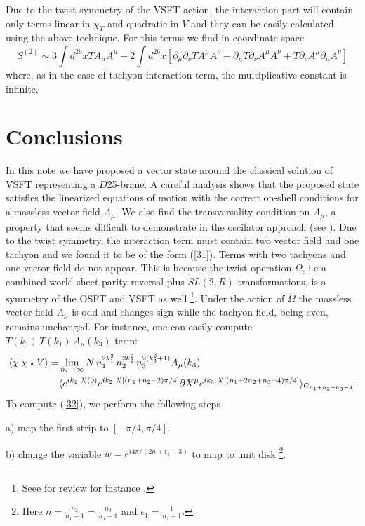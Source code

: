 \documentclass[a4paper,12pt]{article}
\begin{document}
Due to the twist symmetry of the VSFT action, the interaction part will contain
only terms linear in $\chi_T$ and quadratic in $V$ and they can be 
easily calculated using the above technique.
For this terms we find in coordinate space
\begin{equation}
S^{(2)}\sim 3\int d^{26}x T A_\mu A^\mu +
2\int d^{26}x \left[\partial_\mu\partial_\nu T A^\mu A^\nu 
-\partial_\mu T\partial_\nu A^\mu A^\nu +
T\partial_\nu  A^\mu \partial_\mu A^\nu\right]
\label{31}
\end{equation}
where, as in the case of tachyon interaction term, the multiplicative
constant is infinite.

\section{Conclusions}

In this note we have proposed a vector state around the classical solution of
VSFT representing a $D$25-brane. A careful analysis shows that the 
proposed state
satisfies the linearized equations of motion with the correct on-shell
conditions for a massless vector field $A_\mu$. We also find the transversality
condition on $A_\mu$, a property that seems difficult to 
demonstrate in the oscilator approach (see \cite{hk,hm}). 
Due to the twist symmetry, the interaction term must contain two vector field 
and one tachyon and we found it to be of the form (\ref{31}). 
Terms with two tachyons and one vector field do not appear. This is because 
the twist operation $\Omega$, i.e a combined world-sheet parity reversal 
plus $SL(2,R)$ transformations, is a symmetry of the OSFT and VSFT as well
\footnote{Seee for review for instance \cite{oh,ir}.}. Under the action of
$\Omega$ the massless vector field $A_\mu$ is odd and changes sign while
the tachyon field, being even, remains unchanged. For instance, one can 
easily compute $T(k_1)\,T(k_1)\,A_\mu(k_3)$ term:
\begin{align}
\langle\chi|\chi\star V\rangle
=&\lim_{n_i\to\infty}N\,n_1^{2k_1^2}\,n_2^{2k_2^2}\,n_3^{2(k_3^2+1)}
A_\mu(k_3) \notag \\
&\langle e^{ik_1.X(0)}e^{ik_2.X[(n_1+n_2-2)\pi/4]}
\partial X^\mu e^{ik_3.X[(n_1+2n_2+n_3-4)\pi/4]}
\rangle_{C_{n_1+n_2+n_3-3}}.
\label{32}
\end{align}
To compute (\ref{32}), we perform the following steps

a) map the first strip to $[-\pi/4,\pi/4]$.

b) change the variable $w=e^{i4\pi/(2n+\epsilon_1-3)}$ to map to unit disk
\footnote{Here $n=\frac{n_2}{n_1-1}=\frac{n_3}{n_1-1}$ and $\epsilon_1=
\frac{1}{n_1-1}$.}.
\end{document}
